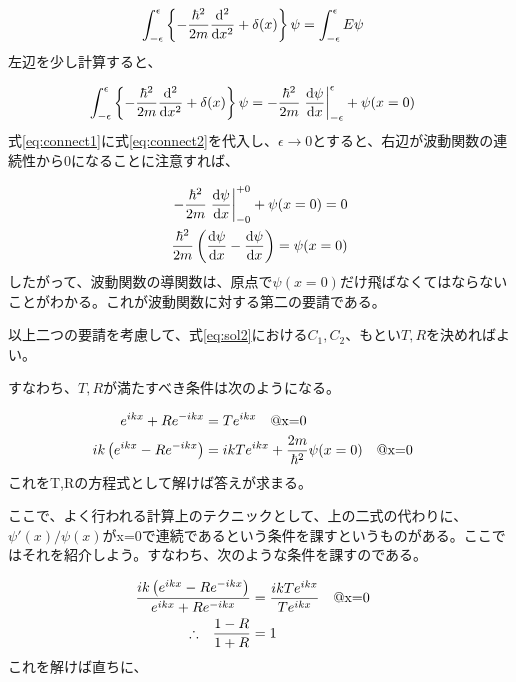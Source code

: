 \documentclass[uplatex,dvipdfmx]{jsarticle}
\begin{document}
\begin{align}
    \int_{-\epsilon}^{\epsilon} \left\{-\frac{\hbar^2}{2m} \dv[2]{}{x} + \delta(x) \right\}\psi &= \int_{-\epsilon}^{\epsilon}E\psi \label{eq:connect1}
\end{align}
左辺を少し計算すると、

\begin{align}
    \int_{-\epsilon}^{\epsilon} \left\{-\frac{\hbar^2}{2m} \dv[2]{}{x} + \delta(x) \right\}\psi &= 
        -\frac{\hbar^2}{2m} \eval{\dv{\psi}{x}}_{-\epsilon}^{\epsilon} + \psi(x=0) \label{eq:connect2}
\end{align}
式\ref{eq:connect1}に式\ref{eq:connect2}を代入し、$\epsilon \rightarrow 0$とすると、右辺が波動関数の連続性から0になることに注意すれば、

\begin{align}
    -\frac{\hbar^2}{2m} \eval{\dv{\psi}{x}}_{-0}^{+0} + \psi(x=0) = 0 \\
    \frac{\hbar^2}{2m} \left(\dv{\psi}{x} (x=+0)-\dv{\psi}{x} (x=-0)\right) = \psi(x=0)
\end{align}
したがって、波動関数の導関数は、原点で$\psi(x=0)$だけ飛ばなくてはならないことがわかる。これが波動関数に対する第二の要請である。


以上二つの要請を考慮して、式\ref{eq:sol2}における$C_1,C_2$、もとい$T,R$を決めればよい。

すなわち、$T,R$が満たすべき条件は次のようになる。

\begin{align}
    e^{ikx} + R e^{-ikx} &= T e^{ikx} \qq{@x=0} \\
    ik\left(e^{ikx} - R e^{-ikx} \right) &= ikT e^{ikx}+\frac{2m}{\hbar^2}\psi(x=0) \qq{@x=0}
\end{align}
これをT,Rの方程式として解けば答えが求まる。

ここで、よく行われる計算上のテクニックとして、上の二式の代わりに、$\psi'(x)/\psi(x)$がx=0で連続であるという条件を課すというものがある。ここではそれを紹介しよう。すなわち、次のような条件を課すのである。

\begin{align}
    \frac{ik\left(e^{ikx} - R e^{-ikx} \right)}{ e^{ikx} + R e^{-ikx}} &= \frac{ikT e^{ikx}}{T e^{ikx}} \qq{@x=0} \\
    \qq{$\therefore$} \frac{1 - R}{1 + R} &= 1
\end{align}
これを解けば直ちに、
\end{document}

